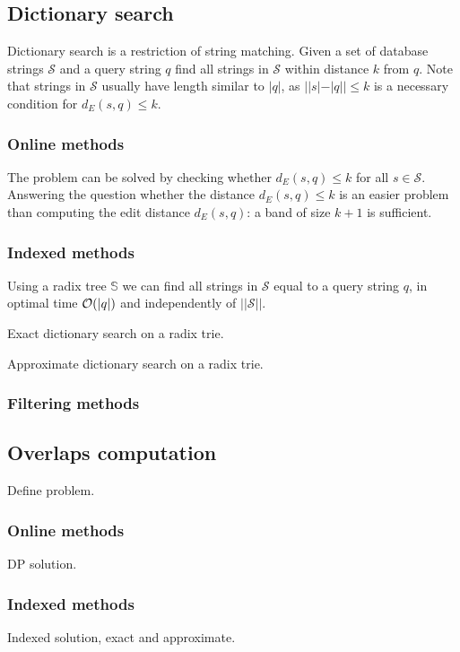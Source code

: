 
\subsection{Dictionary search}

Dictionary search is a restriction of string matching.
Given a set of database strings $\mathcal{S}$ and a query string $q$ find all strings in $\mathcal{S}$ within distance $k$ from $q$.
Note that strings in $\mathcal{S}$ usually have length similar to $|q|$, as $| |s| - |q| | \leq k$ is a necessary condition for $d_E(s,q) \leq k$.

\subsubsection{Online methods}

The problem can be solved by checking whether $d_E(s,q) \leq k$ for all $s \in \mathcal{S}$.
Answering the question whether the distance $d_E(s,q) \leq k$ is an easier problem than computing the edit distance $d_E(s,q)$: a band of size $k+1$ is sufficient.

\subsubsection{Indexed methods}

Using a radix tree $\mathbb{S}$ we can find all strings in $\mathcal{S}$ equal to a query string $q$, in optimal time $\mathcal{O}(|q|)$ and independently of $||\mathcal{S}||$.

\begin{algorithm}[h]
\caption{Exact dictionary search on a radix trie.}
\label{alg:dict-exact}
\end{algorithm}

\begin{algorithm}[h]
\caption{Approximate dictionary search on a radix trie.}
\label{alg:dict-edit}
\end{algorithm}

\subsubsection{Filtering methods}



\subsection{Overlaps computation}

Define problem.

\subsubsection{Online methods}

DP solution.

\subsubsection{Indexed methods}

Indexed solution, exact and approximate.
